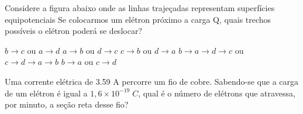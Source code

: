 \documentclass[12pt, addpoints]{exam}
\begin{document}
    \begin{questions}
\begin{multicols*}{2}
\question Considere a figura abaixo onde as linhas trajeçadas representam superfícies equipotenciais Se colocarmos um elétron próximo a carga Q, quais trechos possíveis o elétron poderá se deslocar?
        
        \begin{center}
            \begin{minipage}[c]{0.5\linewidth}
            \end{minipage}
        \end{center}
        
        

\begin{choices}
\choice $b\rightarrow c$ ou $a\rightarrow d$ 
\choice $a\rightarrow b$ ou $d\rightarrow c$ 
\choice $c\rightarrow b$ ou $d\rightarrow a$ 
\choice $b\rightarrow a\rightarrow d\rightarrow c$ ou $c\rightarrow d\rightarrow a\rightarrow b$ 
\choice $b\rightarrow a$ ou $c\rightarrow d$ 
\end{choices}
\question Uma corrente elétrica de    3.59 A percorre um ﬁo de cobre. Sabendo-se que a carga de um elétron é igual a $1,6\times 10^{-19}\;C$, qual é o número de elétrons que atravessa, por minuto, a seção reta desse ﬁo?


\end{multicols*}
\end{questions}
\end{document}
